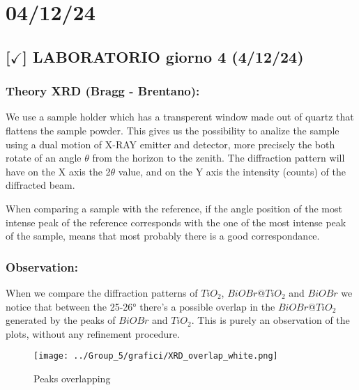 \section{04/12/24}

\subsection{[$\checkmark$] LABORATORIO giorno 4 (4/12/24)}

\subsubsection{Theory XRD (Bragg - Brentano): }

We use a sample holder which has a transperent window made out of quartz that flattens the sample powder. 
This gives us the possibility to analize the sample using a dual motion of X-RAY emitter and detector, more precisely the both rotate of an angle $\theta$ from the horizon to the zenith.
The diffraction pattern will have on the X axis the 2$\theta$ value, and on the Y axis the intensity (counts) of the diffracted beam.

When comparing a sample with the reference, if the angle position of the most intense peak of the reference corresponds with the one of the most intense peak of the sample, means that most probably there is a good correspondance.

\subsubsection{Observation: }

When we compare the diffraction patterns of $TiO_2$, $BiOBr @ TiO_2$ and $BiOBr$ we notice that between the 25-26° there's a possible overlap in the $BiOBr @ TiO_2$ generated by the peaks of $BiOBr$ and $TiO_2$. This is purely an observation of the plots, without any refinement procedure.

\begin{figure}[ht]
    \centering
	\texttt{[image: ../Group\_5/grafici/XRD\_overlap\_white.png]}
    \caption{Peaks overlapping}
\end{figure}